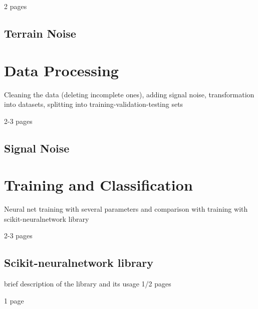 2 pages
\subsection{Terrain Noise} \label{ssec:terrain_noise}

\section{Data Processing}
Cleaning the data (deleting incomplete ones), adding signal noise, transformation into datasets, splitting into training-validation-testing sets

2-3 pages
\subsection{Signal Noise}

\section{Training and Classification}

Neural net training with several parameters and comparison with training with scikit-neuralnetwork library

2-3 pages

\subsection{Scikit-neuralnetwork library}
brief description of the library and its usage 1/2 pages

1 page